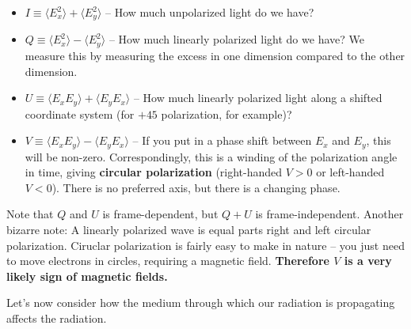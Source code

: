 \documentclass{article}
\begin{document}
\begin{itemize}
    \item $I \equiv \langle E_x^2 \rangle + \langle E_y^2\rangle$ -- How much unpolarized light do we have?
    \item $Q \equiv \langle E_x^2 \rangle - \langle E_y^2\rangle$ -- How much linearly polarized light do we have? We measure this by measuring the excess in one dimension compared to the other dimension.
    \item $U \equiv \langle E_x E_y \rangle + \langle E_y E_x\rangle$ -- How much linearly polarized light along a shifted coordinate system (for $+45$ polarization, for example)?
    \item $V \equiv \langle E_x E_y \rangle - \langle E_y E_x\rangle$ -- If you put in a phase shift between $E_x$ and $E_y$, this will be non-zero. Correspondingly, this is a winding of the polarization angle in time, giving \textbf{circular polarization} (right-handed $V > 0$ or left-handed $V < 0$). There is no preferred axis, but there is a changing phase.
\end{itemize}

Note that $Q$ and $U$ is frame-dependent, but $Q+U$ is frame-independent. Another bizarre note: A linearly polarized wave is equal parts right and left circular polarization. Ciruclar polarization is fairly easy to make in nature -- you just need to move electrons in circles, requiring a magnetic field. \textbf{Therefore $V$ is a very likely sign of magnetic fields.}

Let's now consider how the medium through which our radiation is propagating affects the radiation. 
\end{document}
